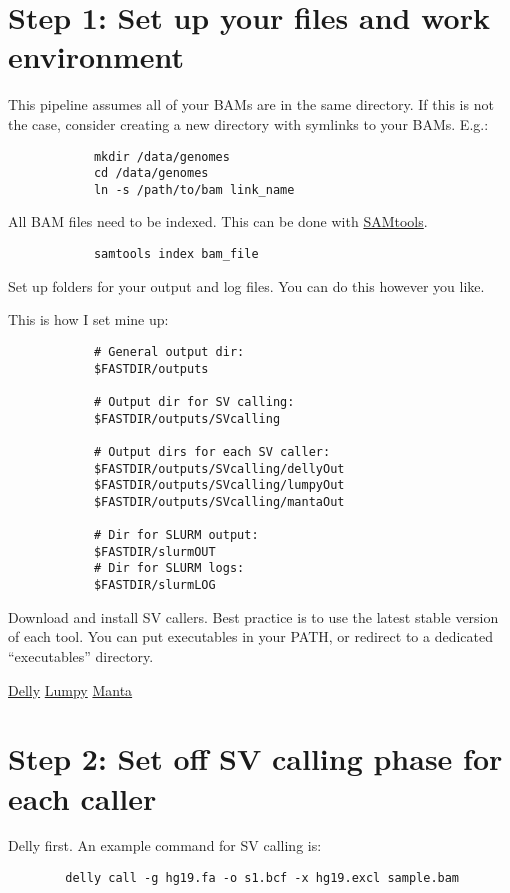 \documentclass[a4paper,11pt]{article} %
\begin{document}
\section*{Step 1: Set up your files and work environment}
	\begin{outline}
		\1 This pipeline assumes all of your BAMs are in the same directory. If this is not the case, consider creating a new directory with symlinks to your BAMs. 
		E.g.:
		\begin{verbatim}
			mkdir /data/genomes
			cd /data/genomes
			ln -s /path/to/bam link_name
		\end{verbatim}

		\1 All BAM files need to be indexed. 
		This can be done with \href{http://www.htslib.org/}{SAMtools}.
		\begin{verbatim}
			samtools index bam_file
		\end{verbatim}
		
		\textit{\textbf{\color{cornflowerblue}{To quickly index many BAMs, try using indexBAM.sh.}}}
		
		\1 Set up folders for your output and log files.
		You can do this however you like. 
		
		This is how I set mine up:
		
		
		\begin{verbatim}
			# General output dir:
			$FASTDIR/outputs
		
			# Output dir for SV calling:
			$FASTDIR/outputs/SVcalling
				
			# Output dirs for each SV caller:
			$FASTDIR/outputs/SVcalling/dellyOut
			$FASTDIR/outputs/SVcalling/lumpyOut
			$FASTDIR/outputs/SVcalling/mantaOut
				
			# Dir for SLURM output:
			$FASTDIR/slurmOUT
			# Dir for SLURM logs: 
			$FASTDIR/slurmLOG
		\end{verbatim}
		
		\1 Download and install SV callers.
		Best practice is to use the latest stable version of each tool. 
		You can put executables in your PATH, or redirect to a dedicated ``executables'' directory. 
		
		\2 \href{https://github.com/dellytools/delly}{Delly}
		\2 \href{https://github.com/arq5x/lumpy-sv}{Lumpy}
		\2 \href{https://github.com/Illumina/manta}{Manta}
		
	\end{outline}

\section*{Step 2: Set off SV calling phase for each caller}
	\begin{outline}
	
	\1 Delly first. An example command for SV calling is:
	\begin{verbatim}
		delly call -g hg19.fa -o s1.bcf -x hg19.excl sample.bam
	\end{verbatim}
	
	\textit{\textbf{\color{cornflowerblue}{Use dellyCalling.sh to run on many genomes.
	You will need the reference genome (e.g. ucsc.hg19.fasta) and tsv file of regions to exclude (ucsc.hg19.excl.tsv).}}}

	
	\end{outline}
\end{document}
